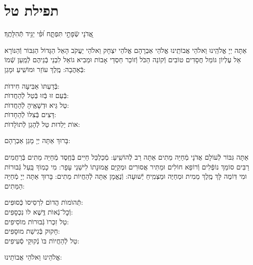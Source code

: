 \documentclass[twoside, openany, parskip=half, 11pt]{book}
\begin{document}
\sepline

\clearpage

\vspace{-1\baselineskip}

\section[תפילת טל]{ תפילת טל }
\label{tefilastal}


\begin{small}
	אֲ֭דֹנָי שְֿׂפָתַ֣י תִּפְתָּ֑ח וּ֝פִ֗י יַגִּ֥יד תְּֿהִלָּתֶֽךָ׃
	\\
\end{small}
אַתָּה יְיָ אֱלֹהֵֽינוּ וֵאלֹהֵי אֲבוֹתֵֽינוּ אֱלֹהֵי אַבְרָהָם אֱלֹהֵי יִצְחָק וֵאלֹהֵי יַעֲקֹב הָאֵל הַגָּדוֹל הַגִּבּוֹר וְֿהַנּוֹרָא אֵל עֶלְיוֹן גּוֹמֵל חֲסָדִים טוֹבִים וְֿקוֹנֵה הַכֹּל וְֿזוֹכֵר חַסְדֵי אָבוֹת וּמֵבִיא גוֹאֵל לִבְנֵי בְֿנֵיהֶם לְֿמַֽעַן שְֿׁמוֹ בְּֿאַהֲבָה: מֶֽלֶךְ עוֹזֵר וּמוֹשִֽׁיעַ וּמָגֵן:


\begin{large}
	בְּֿדַעְתּוׂ אַבִּיעָה חִידוׂת: \\
	בְּֿעַם זוּ בְּֿזוּ בְּֿטַל לְֿהַחֲדוׂת:\\
	טַל גֵּיא וּדְשָׁאֶֽיהָ לְֿהַחֲדוׂת: \\
	דָּצִים בְּֿצִלּוׂ לְֿהֵחָדוׂת:\\
	אוׂת יַלְדוּת טַל לְֿהָגֵן לְֿתוׂלָדוׂת:
	
\end{large}


בָּרוּךְ אַתָּה יְיָ מָגֵן אַבְרָהָם:

אַתָּה גִּבּוֹר לְֿעוֹלָם אֲדֹנָי מְֿחַיֵּה מֵתִים אַתָּה רַב לְֿהוֹשִֽׁיעַ: מְֿכַלְכֵּל חַיִּים בְּֿחֶֽסֶד מְֿחַיֵּה מֵתִים בְּֿרַחֲמִים רַבִּים סוֹמֵךְ נוֹפְֿלִים וְֿרוֹפֵא חוֹלִים וּמַתִּיר אֲסוּרִים וּמְקַיֵּם אֱמוּנָתוֹ לִישֵׁנֵי עָפָר: מִי כָמֽוֹךָ בַּֽעַל גְּֿבוּרוֹת וּמִי דּֽוֹמֶה לָּךְ מֶֽלֶךְ מֵמִית וּמְחַיֶּה וּמַצְמִֽיחַ יְֿשׁוּעָה: וְֿנֶאֱמָן אַתָּה לְֿהַחֲיוֹת מֵתִים: בָּרוּךְ אַתָּה יְיָ מְֿחַיֵּה הַמֵּתִים:


תְּֿהוׂמוׂת הֲדוׂם לִרְסִיסוׂ כְּֿסוּפִים: \\
וְֿכׇל־נְֿאוׂת דֶּֽשֶׁא לוׂ נִכְסָפִים:\\
טַל זִכְרוׂ גְּֿבוּרוׂת מוׂסִיפִים: \\
חָקוּק בְּֿגִישַׁת מוּסָפִים:\\
טַל לְֿהַחֲיוׂת בּוׂ נְֿקוּקֵי סְֿעִיפִים:


\begin{small}
	אֱלֹהֵינוּ וֵאלֹהֵי אֲבוֹתֵינוּ:
\end{small}
\end{document}
